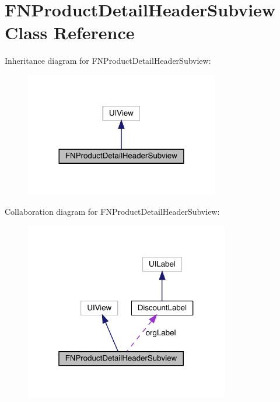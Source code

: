 \hypertarget{interface_f_n_product_detail_header_subview}{}\section{F\+N\+Product\+Detail\+Header\+Subview Class Reference}
\label{interface_f_n_product_detail_header_subview}


Inheritance diagram for F\+N\+Product\+Detail\+Header\+Subview\+:\nopagebreak
\begin{figure}[H]
\begin{center}
\leavevmode
\includegraphics[width=240pt]{interface_f_n_product_detail_header_subview__inherit__graph}
\end{center}
\end{figure}


Collaboration diagram for F\+N\+Product\+Detail\+Header\+Subview\+:\nopagebreak
\begin{figure}[H]
\begin{center}
\leavevmode
\includegraphics[width=253pt]{interface_f_n_product_detail_header_subview__coll__graph}
\end{center}
\end{figure}
